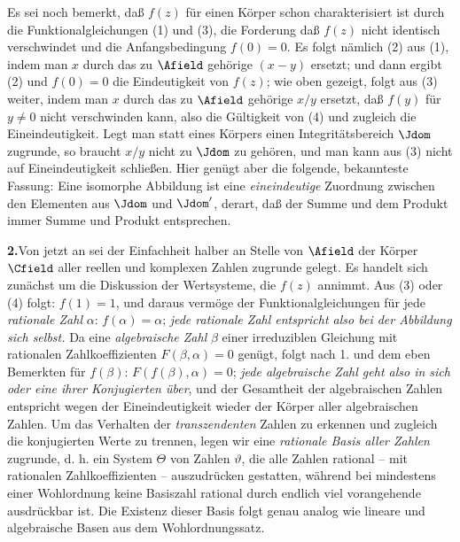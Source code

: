Es sei noch bemerkt, daß \(f(z)\) für einen Körper schon charakterisiert ist durch die Funktionalgleichungen (1) und (3), die Forderung daß \(f(z)\) nicht identisch verschwindet und die Anfangsbedingung \(f(0)=0\). Es folgt nämlich (2) aus (1), indem man \(x\) durch das zu \(\Afield\) gehörige \((x-y)\) ersetzt; und dann ergibt (2) und \(f(0)=0\) die Eindeutigkeit von \(f(z)\); wie oben gezeigt, folgt aus (3) weiter, indem man \(x\) durch das zu \(\Afield\) gehörige \(x/y\) ersetzt, daß \(f(y)\) für \(y\ne0\) nicht verschwinden kann, also die Gültigkeit von (4) und zugleich die Eineindeutigkeit. Legt man statt eines Körpers einen Integritätsbereich \(\Jdom\) zugrunde, so braucht \(x/y\) nicht zu \(\Jdom\) zu gehören, und man kann aus (3) nicht auf Eineindeutigkeit schließen. Hier genügt aber die folgende, bekannteste Fassung: Eine isomorphe Abbildung ist eine \emph{eineindeutige} Zuordnung zwischen den Elementen aus \(\Jdom\) und \(\Jdom'\), derart, daß der Summe und dem Produkt immer Summe und Produkt entsprechen.

\medskip
\noindent\textbf{2.}\quad Von jetzt an sei der Einfachheit halber an Stelle von \(\Afield\) der Körper \(\Cfield\) aller reellen und komplexen Zahlen zugrunde gelegt. Es handelt sich zunächst um die Diskussion der Wertsysteme, die \(f(z)\) annimmt. Aus (3) oder (4) folgt: \(f(1)=1\), und daraus vermöge der Funktionalgleichungen für jede \emph{rationale Zahl} \(\alpha\): \(f(\alpha)=\alpha\); \emph{jede rationale Zahl entspricht also bei der Abbildung sich selbst.} Da eine \emph{algebraische Zahl} \(\beta\) einer irreduziblen Gleichung mit rationalen Zahlkoeffizienten \(F(\beta,\alpha)=0\) genügt, folgt nach 1. und dem eben Bemerkten für \(f(\beta)\): \(F(f(\beta),\alpha)=0\); \emph{jede algebraische Zahl geht also in sich oder eine ihrer Konjugierten über}, und der Gesamtheit der algebraischen Zahlen entspricht wegen der Eineindeutigkeit wieder der Körper aller algebraischen Zahlen. Um das Verhalten der \emph{transzendenten} Zahlen zu erkennen und zugleich die konjugierten Werte zu trennen, legen wir eine \emph{rationale Basis aller Zahlen} zugrunde, d. h. ein System \(\Theta\) von Zahlen \(\vartheta\), die alle Zahlen rational -- mit rationalen Zahlkoeffizienten -- auszudrücken gestatten, während bei mindestens einer Wohlordnung keine Basiszahl rational durch endlich viel vorangehende ausdrückbar ist. Die Existenz dieser Basis folgt genau analog wie lineare und algebraische Basen aus dem Wohlordnungssatz.

